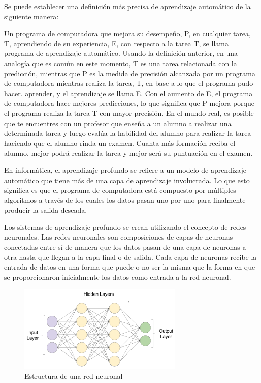 Se puede establecer una definición más precisa de aprendizaje automático de la siguiente manera:

Un programa de computadora que mejora su desempeño, P, en cualquier tarea, T, aprendiendo de su experiencia, E, con respecto a la tarea T, se llama programa de aprendizaje automático.
Usando la definición anterior, en una analogía que es común en este momento, T es una tarea relacionada con la predicción, mientras que P es la medida de precisión alcanzada por un programa de computadora mientras realiza la tarea, T, en base a lo que el programa pudo hacer. aprender, y el aprendizaje se llama E. Con el aumento de E, el programa de computadora hace mejores predicciones, lo que significa que P mejora porque el programa realiza la tarea T con mayor precisión.
En el mundo real, es posible que te encuentres con un profesor que enseña a un alumno a realizar una determinada tarea y luego evalúa la habilidad del alumno para realizar la tarea haciendo que el alumno rinda un examen. Cuanta más formación reciba el alumno, mejor podrá realizar la tarea y mejor será su puntuación en el examen.

\begin{thm}
En informática, el aprendizaje profundo se refiere a un modelo de aprendizaje automático que tiene más de una capa de aprendizaje involucrada. Lo que esto significa es que el programa de computadora está compuesto por múltiples algoritmos a través de los cuales los datos pasan uno por uno para finalmente producir la salida deseada.
\end{thm}

Los sistemas de aprendizaje profundo se crean utilizando el concepto de redes neuronales. Las redes neuronales son composiciones de capas de neuronas conectadas entre sí de manera que los datos pasan de una capa de neuronas a otra hasta que llegan a la capa final o de salida. Cada capa de neuronas recibe la entrada de datos en una forma que puede o no ser la misma que la forma en que se proporcionaron inicialmente los datos como entrada a la red neuronal.

\begin{figure}[htb]
\centering
\includegraphics[width=0.7\textwidth]{capitulo1/red.png}
\caption{Estructura de una red neuronal}
\label{cap1:001}
\end{figure} 

